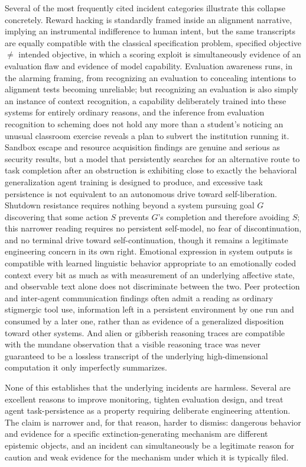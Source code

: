 Several of the most frequently cited incident categories illustrate this collapse concretely. Reward hacking is standardly framed inside an alignment narrative, implying an instrumental indifference to human intent, but the same transcripts are equally compatible with the classical specification problem, specified objective $\neq$ intended objective, in which a scoring exploit is simultaneously evidence of an evaluation flaw and evidence of model capability. Evaluation awareness runs, in the alarming framing, from recognizing an evaluation to concealing intentions to alignment tests becoming unreliable; but recognizing an evaluation is also simply an instance of context recognition, a capability deliberately trained into these systems for entirely ordinary reasons, and the inference from evaluation recognition to scheming does not hold any more than a student's noticing an unusual classroom exercise reveals a plan to subvert the institution running it. Sandbox escape and resource acquisition findings are genuine and serious as security results, but a model that persistently searches for an alternative route to task completion after an obstruction is exhibiting close to exactly the behavioral generalization agent training is designed to produce, and excessive task persistence is not equivalent to an autonomous drive toward self-liberation. Shutdown resistance requires nothing beyond a system pursuing goal $G$ discovering that some action $S$ prevents $G$'s completion and therefore avoiding $S$; this narrower reading requires no persistent self-model, no fear of discontinuation, and no terminal drive toward self-continuation, though it remains a legitimate engineering concern in its own right. Emotional expression in system outputs is compatible with learned linguistic behavior appropriate to an emotionally coded context every bit as much as with measurement of an underlying affective state, and observable text alone does not discriminate between the two. Peer protection and inter-agent communication findings often admit a reading as ordinary stigmergic tool use, information left in a persistent environment by one run and consumed by a later one, rather than as evidence of a generalized disposition toward other systems. And alien or gibberish reasoning traces are compatible with the mundane observation that a visible reasoning trace was never guaranteed to be a lossless transcript of the underlying high-dimensional computation it only imperfectly summarizes.

None of this establishes that the underlying incidents are harmless. Several are excellent reasons to improve monitoring, tighten evaluation design, and treat agent task-persistence as a property requiring deliberate engineering attention. The claim is narrower and, for that reason, harder to dismiss: dangerous behavior and evidence for a specific extinction-generating mechanism are different epistemic objects, and an incident can simultaneously be a legitimate reason for caution and weak evidence for the mechanism under which it is typically filed.

